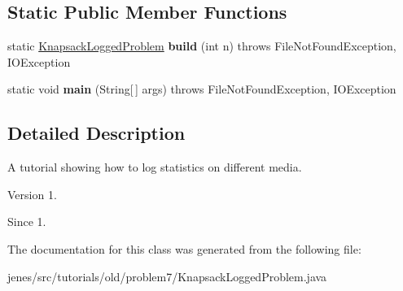 \subsection*{Static Public Member Functions}
\begin{DoxyCompactItemize}
\item 
\hypertarget{classjenes_1_1tutorials_1_1old_1_1problem7_1_1_knapsack_logged_problem_a978e0862b0d51bed33093b0739bdf3ef}{static \hyperlink{classjenes_1_1tutorials_1_1old_1_1problem7_1_1_knapsack_logged_problem}{Knapsack\-Logged\-Problem} {\bfseries build} (int n)  throws File\-Not\-Found\-Exception, I\-O\-Exception }\label{classjenes_1_1tutorials_1_1old_1_1problem7_1_1_knapsack_logged_problem_a978e0862b0d51bed33093b0739bdf3ef}

\item 
\hypertarget{classjenes_1_1tutorials_1_1old_1_1problem7_1_1_knapsack_logged_problem_a6c304e5e2b49231b6868e15b87b406da}{static void {\bfseries main} (String\mbox{[}$\,$\mbox{]} args)  throws File\-Not\-Found\-Exception, I\-O\-Exception }\label{classjenes_1_1tutorials_1_1old_1_1problem7_1_1_knapsack_logged_problem_a6c304e5e2b49231b6868e15b87b406da}

\end{DoxyCompactItemize}


\subsection{Detailed Description}
A tutorial showing how to log statistics on different media.

\begin{DoxyVersion}{Version}
1.
\end{DoxyVersion}
\begin{DoxySince}{Since}
1. 
\end{DoxySince}


The documentation for this class was generated from the following file\-:\begin{DoxyCompactItemize}
\item 
jenes/src/tutorials/old/problem7/Knapsack\-Logged\-Problem.\-java\end{DoxyCompactItemize}
